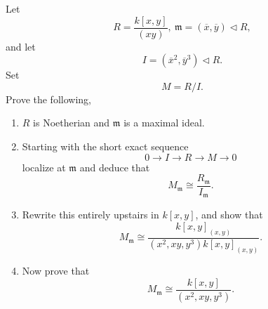 \documentclass[11pt]{article}
\begin{document}
\begin{prob}
    Let 
    \[
        R = \frac{k[x,y]}{(xy)}, \ \mathfrak m = 
        (\overline x, \overline y) \triangleleft R, 
    \]
    and let 
    \[
        I = (\overline x^2, \overline y^3) \triangleleft R. 
    \]
    Set 
    \[
        M = R/I. 
    \]
    Prove the following, 
    \begin{enumerate}
        \item $R$ is Noetherian and $\mathfrak m$ is a maximal 
            ideal. 
        \item Starting with the short exact sequence 
            \[
                0 \to I \to R \to M \to 0
            \]
            localize at $\mathfrak m$ and deduce that 
            \[
                M_{\mathfrak m} \cong 
                \frac{R_{\mathfrak m}}{I_{\mathfrak m}}.
            \]
        \item Rewrite this entirely upstairs in $k[x,y]$, 
            and show that 
            \[
                M_{\mathfrak m}
                \cong
                \frac{k[x,y]_{(x,y)}}{(x^2,xy,y^3)k[x,y]_{(x,y)}}.
            \]
        \item Now prove that 
            \[
                M_{\mathfrak m} 
                \cong \frac{k[x,y]}{(x^2,xy,y^3)}. 
            \]
    \end{enumerate}
\end{prob}
\end{document}
